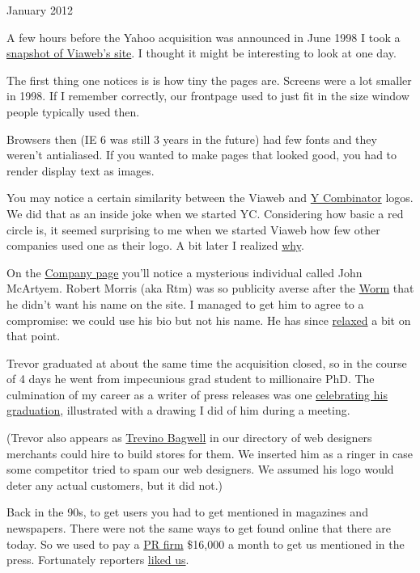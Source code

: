 January 2012

A few hours before the Yahoo acquisition was announced in June 1998 I
took a \href{http://ycombinator.com/viaweb}{snapshot of Viaweb's site}.
I thought it might be interesting to look at one day.

The first thing one notices is is how tiny the pages are. Screens were a
lot smaller in 1998. If I remember correctly, our frontpage used to just
fit in the size window people typically used then.

Browsers then (IE 6 was still 3 years in the future) had few fonts and
they weren't antialiased. If you wanted to make pages that looked good,
you had to render display text as images.

You may notice a certain similarity between the Viaweb and
\href{http://ycombinator.com}{Y Combinator} logos. We did that as an
inside joke when we started YC. Considering how basic a red circle is,
it seemed surprising to me when we started Viaweb how few other
companies used one as their logo. A bit later I realized
\href{zero.html}{why}.

On the \href{http://www.ycombinator.com/viaweb/com.html}{Company page}
you'll notice a mysterious individual called John McArtyem. Robert
Morris (aka Rtm) was so publicity averse after the
\href{http://en.wikipedia.org/wiki/Morris_worm}{Worm} that he didn't
want his name on the site. I managed to get him to agree to a
compromise: we could use his bio but not his name. He has since
\href{http://ycombinator.com/people.html}{relaxed} a bit on that point.

Trevor graduated at about the same time the acquisition closed, so in
the course of 4 days he went from impecunious grad student to
millionaire PhD. The culmination of my career as a writer of press
releases was one
\href{http://ycombinator.com/viaweb/trevor.html}{celebrating his
graduation}, illustrated with a drawing I did of him during a meeting.

(Trevor also appears as
\href{http://ycombinator.com/viaweb/tlbwebdesign.html}{Trevino Bagwell}
in our directory of web designers merchants could hire to build stores
for them. We inserted him as a ringer in case some competitor tried to
spam our web designers. We assumed his logo would deter any actual
customers, but it did not.)

Back in the 90s, to get users you had to get mentioned in magazines and
newspapers. There were not the same ways to get found online that there
are today. So we used to pay a \href{submarine.html}{PR firm} \$16,000 a
month to get us mentioned in the press. Fortunately reporters
\href{http://ycombinator.com/viaweb/presquot.html}{liked us}.

